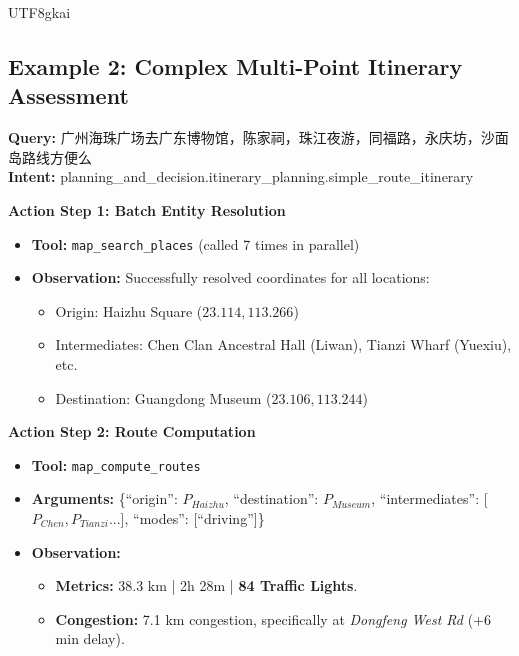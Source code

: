 \documentclass{article} %
\begin{document}
\begin{CJK*}{UTF8}{gkai}



\subsection{Example 2: Complex Multi-Point Itinerary Assessment}
\begin{tcolorbox}[
    breakable,
    enhanced,
    colframe=color_amapblue,
    colback=mycolor,
    coltitle=white,
    title = {\textbf{Case Study: Multi-stop Route Feasibility Check}},
    fonttitle=\bfseries
]

\textbf{Query:} 广州海珠广场去广东博物馆，陈家祠，珠江夜游，同福路，永庆坊，沙面岛路线方便么\\
\textbf{Intent:} planning\_and\_decision.itinerary\_planning.simple\_route\_itinerary
\tcblower

\textbf{Action Step 1: Batch Entity Resolution}
\begin{itemize}[leftmargin=12pt, itemsep=0pt]
  \item \textbf{Tool:} \texttt{map\_search\_places} (called 7 times in parallel)
  \item \textbf{Observation:} Successfully resolved coordinates for all locations:
    \begin{itemize}[leftmargin=10pt, itemsep=0pt]
        \item Origin: Haizhu Square ($23.114, 113.266$)
        \item Intermediates: Chen Clan Ancestral Hall (Liwan), Tianzi Wharf (Yuexiu), etc.
        \item Destination: Guangdong Museum ($23.106,113.244$)
    \end{itemize}
\end{itemize}
\vspace{5pt}
\textbf{Action Step 2: Route Computation}
\begin{itemize}[leftmargin=12pt, itemsep=0pt]
  \item \textbf{Tool:} \texttt{map\_compute\_routes}
  \item \textbf{Arguments:} \{``origin'': $P_{Haizhu}$, ``destination'': $P_{Museum}$, ``intermediates'': [$P_{Chen}, P_{Tianzi}...$], ``modes'': [``driving'']\}
  \item \textbf{Observation:} 
    \begin{itemize}[leftmargin=10pt]
        \item \textbf{Metrics:} 38.3 km | 2h 28m | \textbf{84 Traffic Lights}.
        \item \textbf{Congestion:} 7.1 km congestion, specifically at \textit{Dongfeng West Rd} (+6 min delay).
    \end{itemize}
\end{itemize}


\end{tcolorbox}
\end{CJK*}
\end{document}
